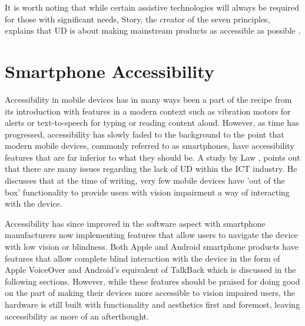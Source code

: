 It is worth noting that while certain assistive technologies will always be required for those with significant needs, Story, the creator of the seven principles, explains that UD is about making mainstream products as accessible as possible \cite{sevenprinciples}.


\section{Smartphone Accessibility}
Accessibility in mobile devices has in many ways been a part of the recipe from its introduction with features in a modern context such as vibration motors for alerts or text-to-speech for typing or reading content aloud.
However, as time has progressed, accessibility has slowly faded to the background to the point that modern mobile devices, commonly referred to as smartphones, have accessibility features that are far inferior to what they should be. %
A study by Law \cite{cellphone}, points out that there are many issues regarding the lack of UD within the ICT industry. %
He discusses that at the time of writing, very few mobile devices have 'out of the box' functionality to provide users with vision impairment a way of interacting with the device.


Accessibility has since improved in the software aspect with smartphone manufacturers now implementing features that allow users to navigate the device with low vision or blindness.
Both Apple and Android smartphone products have features that allow complete blind interaction with the device in the form of Apple VoiceOver \cite{iphone} and Android's equivalent of TalkBack \cite{android} which is discussed in the following sections.
However, while these features should be praised for doing good on the part of making their devices more accessible to vision impaired users, the hardware is still built with functionality and aesthetics first and foremost, leaving accessibility as more of an afterthought.

